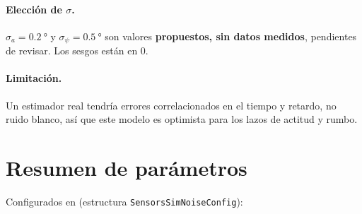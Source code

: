 \documentclass[11pt,a4paper]{article}
\begin{document}
\paragraph{Elección de $\sigma$.} $\sigma_a = \SI{0.2}{\degree}$ y
$\sigma_\psi = \SI{0.5}{\degree}$ son valores \textbf{propuestos, sin datos
medidos}, pendientes de revisar. Los sesgos están en 0.

\paragraph{Limitación.} Un estimador real tendría errores correlacionados en el
tiempo y retardo, no ruido blanco, así que este modelo es optimista para los
lazos de actitud y rumbo.

\section{Resumen de parámetros}

Configurados en  (estructura \texttt{SensorsSimNoiseConfig}):
\end{document}
